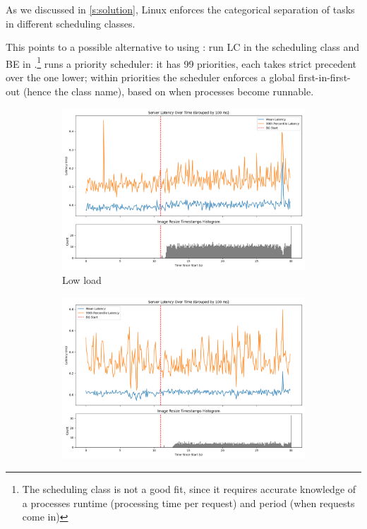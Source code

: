 As we discussed in \autoref{s:solution}, Linux enforces the categorical
separation of tasks in different scheduling classes. 

This points to a possible alternative to using \cgroups{}: run LC in the
\fifoclass{} scheduling class and BE in \normalclass{}.\footnote{The
\deadlineclass{} scheduling class is not a good fit, since it requires accurate
knowledge of a processes runtime (processing time per request) and period (when
requests come in)} \fifoclass{} runs a priority scheduler: it has 99 priorities,
each takes strict precedent over the one lower; within priorities the scheduler
enforces a global first-in-first-out (hence the \fifoclass{} class name), based
on when processes become runnable.

\begin{figure}[t]
    \centering
    \begin{subfigure}[t]{0.48\columnwidth}
        \includegraphics[width=\columnwidth]{graphs/srv-bg-rt-low.png}
        \caption{Low load}\label{fig:srv-bg-rt-low}
    \end{subfigure}
    \hspace{\fill}
    \begin{subfigure}[t]{0.48\columnwidth}
        \includegraphics[width=\columnwidth]{graphs/srv-bg-rt-high.png}

\end{subfigure}
\end{figure}

